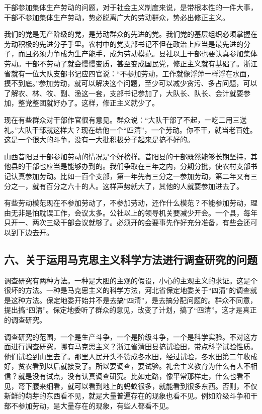 干部参加集体生产劳动的问题，对于社会主义制度来说，是带根本性的一件大事，干部不参加集体生产劳动，势必脱离广大的劳动群众，势必出修正主义。

我们的党是无产阶级的党，是劳动群众的先进的党。我们党的基层组织必须掌握在劳动积极的先进分子手里。农村中的党支部书记不但在政治上应当是最先进的分子，而且必须力争成为生产能手，成为劳动模范。县社以上干部也要认真参加集体劳动。干部不劳动了就会慢慢变质，甚至变成国民党，修正主义就有基础了。浙江省就有一位大队支部书记应四官说：“不参加劳动，工作就像浮萍一样浮在水面，摸不到底。”参加劳动，就可以解决这个问题，至少可以减少贪污、多占问题，可以了解农、林、牧、副、渔这一套，支部书记参加了，大队长、队长、会计就要参加，整党整团就好办了。这样，修正主义就少了。

现在有些群众对干部作官很有意见。群众说：“大队干部了不起，一吃二用三送礼。”大队干部就这样大？现在给他一个“四清”，一个劳动。你不干，就当老百姓。这是一个很大的斗争，没有一大批积极分子起来是搞不好的。

山西昔阳县干部参加劳动的情况是个好榜样。昔阳县的干部既然能够长期坚持，其他县的干部也应当是能够办到的。我们争取在三年之内，分期分批，使农村支部书记认真参加劳动。比如一百个支部，第一年先有三分之一参加劳动，第二年又有三分之一，就有百分之六十的人。这样声势就大了，其他的人就要参加进去了。

有些劳动模范现在不参加劳动了，不参加劳动，还作什么模范？不能参加劳动，理由无非是怕耽误工作，会议太多。公社以上的领导机关要减少开会。一个县，每年只开一、两次三级干部会议就够了。必须开的会要事先作好充分准备，有些会还可以到下边去开。

\subsection{六、关于运用马克思主义科学方法进行调查研究的问题}

调查研究有两种方法。一种是大胆的主观的假设，小心的主观主义的求证。这是个很坏的方法。一种是马克思主义的科学方法，河北省保定地委关于“四清”的调查就是这种方法。保定地委开始并不是去搞“四清”，是去搞分配问题的。群众不同意，提出搞“四清”。保定地委听了群众的意见，改变了计划，搞了“四清”。这才是真正的调查研究。

调查研究的范围，一个是生产斗争，一个是阶级斗争，一个是科学实验。不对这方面进行调查研究，哪有马克思主义？浙江省清田县搞试验田，带点科学试验性质。他们试验到山里去了。那里人民开头不赞成冬水田，经过试验，冬水田第二年收成好，贫农看到以后就接受了。所以要调查，要试验。礼会主义教育为什么有人不相信？就是没有试点，没有认真调查研究。比如走路，像平常那样走，什么也看不见，弯下腰来细看，就可以看到地上的蚂蚁很多，就能看到很多东西。否则，不仅新鲜的萌芽的东西看不见，就是大量普遍存在的现象也看不见。例如阶级斗争和干部不参加劳动，是大量存在的现象，有些人都看不见。

